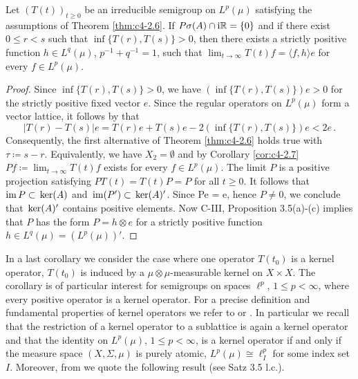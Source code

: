 \begin{corollary}\label{cor:c4-2.10}
%
%
%
Let $(T(t))_{t\geq 0}$ be an irreducible semigroup on $L^{p}(\mu)$ satisfying the assumptions of Theorem \ref{thm:c4-2.6}.
If $P{\sigma}(A) \cap \mathrm{i}\mathbb{R} = \{0\}$ and if there exist $0 \leq r < s$ such that $\inf\{T(r),T(s)\} > 0$, then there exists a strictly positive function $h \in L^{q}(\mu)$, $p^{-1}+q^{-1} = 1$, such that $\lim_{t \to \infty} T(t)f = \langle f,h \rangle e$ for every $f \in L^{p}(\mu)$.
\end{corollary}
\begin{proof}
Since $\inf\{T(r),T(s)\} > 0$, we have $(\inf\{T(r),T(s)\})e > 0$ for the strictly positive fixed vector $e$.
Since the regular operators on $L^{p}(\mu)$ form a vector lattice, it follows by \citet[II.1.4, Formula (5) \& (5')]{schaefer:1974} that 
\[
|T(r) - T(s)|e = T(r)e + T(s)e - 2(\inf\{T(r),T(s)\})e < 2e\,.
\]
Consequently, the first alternative of Theorem \ref{thm:c4-2.6} holds true with $\tau \coloneqq s-r$.
Equivalently, we have $X_{2} = \emptyset$ and by Corollary \ref{cor:c4-2.7} $Pf \coloneqq \lim_{t \to \infty} T(t)f$ exists for every $f \in L^{p}(\mu)$.
The limit $P$ is a positive projection satisfying $PT(t) = T(t)P = P$ for all $t \geq 0$.
It follows that $\text{im}\,P \subset \mathop{}\mathrm{ker}(A)$ and $\mathop{}\mathrm{im}(P') \subset \mathop{}\mathrm{ker}(A)'$.
Since Pe = e, hence $P \neq 0$, we conclude that $\mathop{}\mathrm{ker}(A)'$ contains positive elements.
Now C-III, Proposition 3.5(a)-(c) implies that $P$ has the form $P = h \otimes e$ for a strictly positive function $h \in L^{q}(\mu) = (L^{p}(\mu))'$.
\end{proof}
In a last corollary we consider the case where one operator $T(t_{0})$ is a kernel operator, \ie  $T(t_{0})$ is induced by a $\mu \otimes \mu$-measurable kernel on $X \times X$.
The corollary is of particular interest for semigroups on spaces $\ell^{p}$, $1 \leq p < \infty$, where every positive operator is a kernel operator.
For a precise definition and fundamental properties of kernel operators we refer to \citet[Section IV.9]{schaefer:1974} or \citet[Chapter 13]{zaanen:1983}.
In particular we recall that the restriction of a kernel operator to a sublattice is again a kernel operator and that
the identity on $L^{p}(\mu)$, $1 \leq p < \infty$, is a kernel operator if and only if the measure space $(X,\Sigma,\mu)$ is purely atomic, \ie  $L^{p}(\mu) \cong \ell^{p}_{I}$ for some index set $I$.
Moreover, from \citet{axmann:1980} we quote the following result (see Satz 3.5 l.c.).
